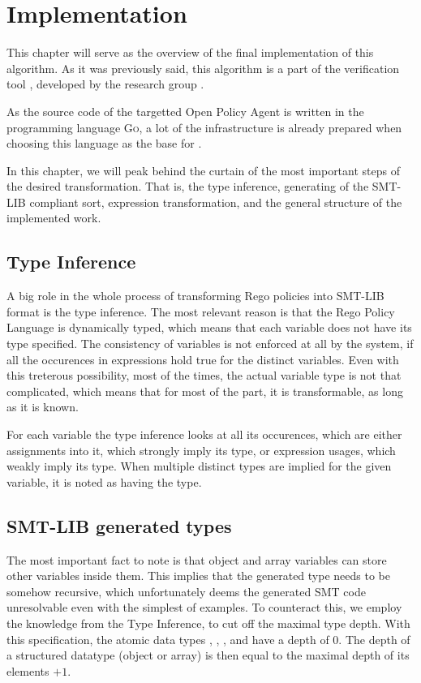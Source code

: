 \chapter{Implementation}
\label{ch:implementation}

This chapter will serve as the overview of the final implementation of this algorithm.
As it was previously said, this algorithm is a part of the verification tool , developed by the research group .

As the source code of the targetted Open Policy Agent \cite{opa:git} is written in the programming language \textsc{Go}, a lot of the infrastructure is already prepared when choosing this language as the base for .

In this chapter, we will peak behind the curtain of the most important steps of the desired transformation.
That is, the type inference, generating of the SMT-LIB compliant sort, expression transformation, and the general structure of the implemented work.

\section{Type Inference}
A big role in the whole process of transforming Rego policies into SMT-LIB format is the type inference.
The most relevant reason is that the Rego Policy Language is dynamically typed, which means that each variable does not have its type specified.
The consistency of variables is not enforced at all by the system, if all the occurences in expressions hold true for the distinct variables.
Even with this treterous possibility, most of the times, the actual variable type is not that complicated, which means that for most of the part, it is transformable, as long as it is known.

For each variable the type inference looks at all its occurences, which are either assignments into it, which strongly imply its type, or expression usages, which weakly imply its type.
When multiple distinct types are implied for the given variable, it is noted as having the  type.


\section{SMT-LIB generated types}

The most important fact to note is that object and array variables can store other variables inside them.
This implies that the generated type needs to be somehow recursive, which unfortunately deems the generated SMT code unresolvable even with the simplest of examples.
To counteract this, we employ the knowledge from the Type Inference, to cut off the maximal type depth.
With this specification, the atomic data types , , , and  have a depth of $0$.
The depth of a structured datatype (object or array) is then equal to the maximal depth of its elements $+ 1$.

